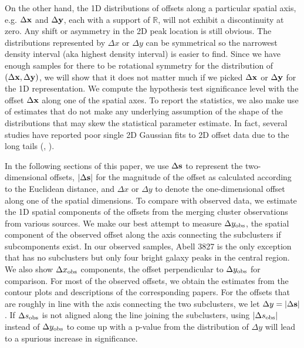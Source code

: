 On the other hand, 
the 1D distributions of offsets along a particular spatial axis, 
e.g. $\Delta {\bf x}$ and $\Delta {\bf y}$,
each with a support of $\mathbb{R}$, will not exhibit a discontinuity at zero.
Any shift or asymmetry in the 2D peak location is still obvious. 
The distributions represented by $\Delta x$ or $\Delta y$ 
can be symmetrical so 
the narrowest density interval (aka highest density interval) is easier to find.
Since we have enough samples for there to be
rotational symmetry for the distribution of $(\Delta {\bf x}, \Delta {\bf y})$,
we will show that it does not
matter much if we picked $\Delta {\bf x}$ or $\Delta {\bf y}$ for the 1D representation.
We compute the hypothesis test significance level with the 
 offset $\Delta {\bf x}$ along one of the spatial axes. 
To report the statistics, we also make use of estimates that do not make any
underlying assumption of the shape of the distributions that may skew the
statistical parameter estimate.
In fact, several studies have reported poor single 2D Gaussian fits to 2D offset data
due to the long tails
(\citealt{Zitrin2012a}, \citealt{Oguri2010}).  

In the following sections of this paper, we use $\Delta {\bf s}$  to represent the
two-dimensional offsets, $|\Delta {\bf s}|$ for the magnitude of the offset as calculated
according to the Euclidean distance, and $\Delta x$ or $\Delta y$ to denote the
one-dimensional offset along one of the spatial dimensions.
To compare with observed data, we estimate the 1D spatial components of
the offsets from the merging cluster observations from various sources.   
We make our best attempt to measure $\Delta y_{\rm obs}$, the spatial component of the
observed offset along the axis connecting the subclusters if subcomponents exist. 
In our observed samples, Abell 3827 is the only exception that has no
subclusters but only four bright galaxy peaks in the central region. 
We also show $\Delta x_{\rm obs}$ components, the offset perpendicular to
$\Delta y_{\rm obs}$ for comparison.
For most of the observed offsets, we obtain the estimates from the contour plots 
and descriptions of the corresponding papers. 
For the offsets that are roughly in line with the axis connecting the two subclusters,
we let $\Delta y = |\Delta {\bf s}|$. 
If $\Delta s_{\rm obs}$ is not aligned along the line joining the subclusters,
using $|\Delta s_{\rm obs}|$ instead of $\Delta y_{\rm obs}$ to come 
up with a p-value from the distribution of 
$\Delta y$ will lead to a spurious increase in significance.

